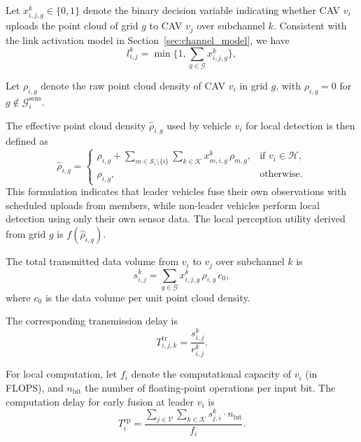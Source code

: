 \documentclass[conference]{IEEEtran}
\begin{document}
Let $x_{i,j,g}^{k} \in \{0,1\}$ denote the binary decision variable indicating whether CAV $v_i$ uploads the point cloud of grid $g$ to CAV $v_j$ over subchannel $k$. Consistent with the link activation model in Section~\ref{sec:channel_model}, we have
\begin{equation}
l_{i,j}^{k} = \min\Big\{1, \sum_{g \in \mathcal{G}} x_{i,j,g}^{k} \Big\},
\end{equation}

Let $\rho_{i,g}$ denote the raw point cloud density of CAV $v_i$ in grid $g$, with $\rho_{i,g} = 0$ for $g \notin \mathcal{G}_i^{\mathrm{sens}}$. 

The effective point cloud density $\hat{\rho}_{i,g}$ used by vehicle $v_i$ for local detection is then defined as
\begin{equation}
\hat{\rho}_{i,g} =
\begin{cases}
\rho_{i,g} + \sum\limits_{m \in \mathcal{S}_i \setminus \{i\}} \sum\limits_{k \in \mathcal{K}} x_{m,i,g}^{k} \, \rho_{m,g}, & \text{if } v_i \in \mathcal{H}, \\
\rho_{i,g}, & \text{otherwise}.
\end{cases}
\label{eq:rho_hat}
\end{equation}
This formulation indicates that leader vehicles fuse their own observations with scheduled uploads from members, while non-leader vehicles perform local detection using only their own sensor data. The local perception utility derived from grid $g$ is $f(\hat{\rho}_{i,g})$.


The total transmitted data volume from $v_i$ to $v_j$ over subchannel $k$ is
\begin{equation}
s_{i,j}^{k} = \sum_{g \in \mathcal{G}} x_{i,j,g}^{k} \, \rho_{i,g} \, c_0,
\end{equation}
where $c_0$ is the data volume per unit point cloud density.

The corresponding transmission delay is
\begin{equation}
T^{\mathrm{tr}}_{i,j,k} = \frac{s_{i,j}^{k}}{r_{i,j}^{k}}.
\end{equation}

For local computation, let $f_i$ denote the computational capacity of $v_i$ (in FLOPS), and $n_\mathrm{bit}$ the number of floating-point operations per input bit. The computation delay for early fusion at leader $v_i$ is
\begin{equation}
T^{\mathrm{cp}}_{i} = \frac{\sum_{j \in \mathcal{V}} \sum_{k \in \mathcal{K}} s_{j,i}^{k} \cdot n_\mathrm{bit}}{f_i}.
\end{equation}
\end{document}
